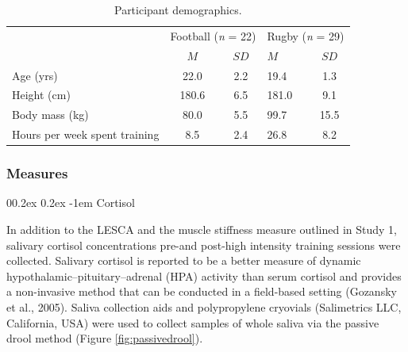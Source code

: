 \documentclass[
  english,
  man,floatsintext]{apa6}
\makeatletter
\renewcommand{\paragraph}{\@startsection{paragraph}{4}{\parindent}%
  {0\baselineskip \@plus 0.2ex \@minus 0.2ex}%
  {-1em}%
  {\normalfont\normalsize\bfseries\itshape\typesectitle}}
\makeatother
\begin{document}
\begin{table}[H]

\begin{center}
\begin{threeparttable}

\caption{\label{tab:parchar2}Participant demographics.}

\begin{tabular}{lcclc}
\toprule
 & \multicolumn{2}{c}{Football (\emph{n} = 22)} & \multicolumn{2}{c}{Rugby (\emph{n} = 29)} \\
\cmidrule(r){2-3} \cmidrule(r){4-5}
  & $M$ & $SD$ & $M$ & $SD$\\
\midrule
Age (yrs) & 22.0 & 2.2 & 19.4 & 1.3\\
Height (cm) & 180.6 & 6.5 & 181.0 & 9.1\\
Body mass (kg) & 80.0 & 5.5 & 99.7 & 15.5\\
Hours per week spent training & 8.5 & 2.4 & 26.8 & 8.2\\
\bottomrule
\end{tabular}

\end{threeparttable}
\end{center}

\end{table}

\hypertarget{measures-2}{%
\subsubsection{Measures}\label{measures-2}}

\hypertarget{cortisol}{%
\paragraph{Cortisol}\label{cortisol}}

In addition to the LESCA and the muscle stiffness measure outlined in Study 1, salivary cortisol concentrations pre-and post-high intensity training sessions were collected.
Salivary cortisol is reported to be a better measure of dynamic hypothalamic--pituitary--adrenal (HPA) activity than serum cortisol and provides a non-invasive method that can be conducted in a field-based setting (Gozansky et al., 2005).
Saliva collection aids and polypropylene cryovials (Salimetrics LLC, California, USA) were used to collect samples of whole saliva via the passive drool method (Figure \ref{fig:passivedrool}).
\end{document}
